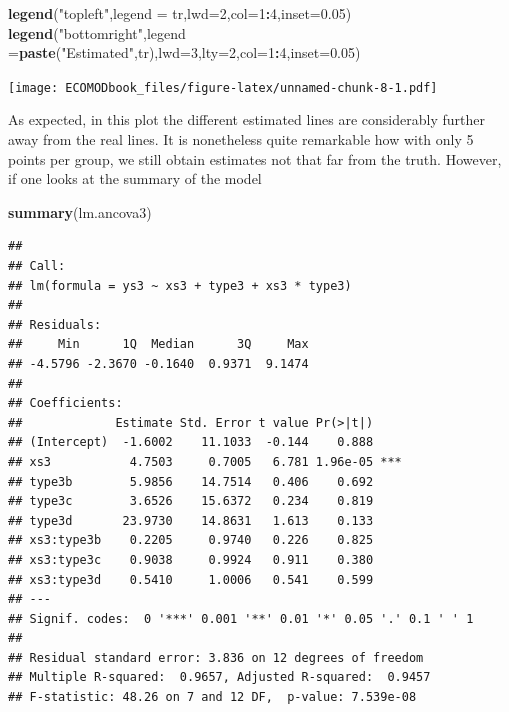 \documentclass[
]{book}
\newenvironment{Shaded}{\begin{snugshade}}{\end{snugshade}}
\newcommand{\AttributeTok}[1]{\textcolor[rgb]{0.13,0.29,0.53}{#1}}
\newcommand{\DecValTok}[1]{\textcolor[rgb]{0.00,0.00,0.81}{#1}}
\newcommand{\FloatTok}[1]{\textcolor[rgb]{0.00,0.00,0.81}{#1}}
\newcommand{\FunctionTok}[1]{\textcolor[rgb]{0.13,0.29,0.53}{\textbf{#1}}}
\newcommand{\NormalTok}[1]{#1}
\newcommand{\SpecialCharTok}[1]{\textcolor[rgb]{0.81,0.36,0.00}{\textbf{#1}}}
\newcommand{\StringTok}[1]{\textcolor[rgb]{0.31,0.60,0.02}{#1}}
\begin{document}
\begin{Shaded}
\begin{Highlighting}[]
\FunctionTok{legend}\NormalTok{(}\StringTok{"topleft"}\NormalTok{,}\AttributeTok{legend =}\NormalTok{ tr,}\AttributeTok{lwd=}\DecValTok{2}\NormalTok{,}\AttributeTok{col=}\DecValTok{1}\SpecialCharTok{:}\DecValTok{4}\NormalTok{,}\AttributeTok{inset=}\FloatTok{0.05}\NormalTok{)}
\FunctionTok{legend}\NormalTok{(}\StringTok{"bottomright"}\NormalTok{,}\AttributeTok{legend =}\FunctionTok{paste}\NormalTok{(}\StringTok{"Estimated"}\NormalTok{,tr),}\AttributeTok{lwd=}\DecValTok{3}\NormalTok{,}\AttributeTok{lty=}\DecValTok{2}\NormalTok{,}\AttributeTok{col=}\DecValTok{1}\SpecialCharTok{:}\DecValTok{4}\NormalTok{,}\AttributeTok{inset=}\FloatTok{0.05}\NormalTok{)}
\end{Highlighting}
\end{Shaded}

\texttt{[image: ECOMODbook\_files/figure-latex/unnamed-chunk-8-1.pdf]}

As expected, in this plot the different estimated lines are considerably further away from the real lines. It is nonetheless quite remarkable how with only 5 points per group, we still obtain estimates not that far from the truth. However, if one looks at the summary of the model

\begin{Shaded}
\begin{Highlighting}[]
\FunctionTok{summary}\NormalTok{(lm.ancova3)}
\end{Highlighting}
\end{Shaded}

\begin{verbatim}
## 
## Call:
## lm(formula = ys3 ~ xs3 + type3 + xs3 * type3)
## 
## Residuals:
##     Min      1Q  Median      3Q     Max 
## -4.5796 -2.3670 -0.1640  0.9371  9.1474 
## 
## Coefficients:
##             Estimate Std. Error t value Pr(>|t|)    
## (Intercept)  -1.6002    11.1033  -0.144    0.888    
## xs3           4.7503     0.7005   6.781 1.96e-05 ***
## type3b        5.9856    14.7514   0.406    0.692    
## type3c        3.6526    15.6372   0.234    0.819    
## type3d       23.9730    14.8631   1.613    0.133    
## xs3:type3b    0.2205     0.9740   0.226    0.825    
## xs3:type3c    0.9038     0.9924   0.911    0.380    
## xs3:type3d    0.5410     1.0006   0.541    0.599    
## ---
## Signif. codes:  0 '***' 0.001 '**' 0.01 '*' 0.05 '.' 0.1 ' ' 1
## 
## Residual standard error: 3.836 on 12 degrees of freedom
## Multiple R-squared:  0.9657, Adjusted R-squared:  0.9457 
## F-statistic: 48.26 on 7 and 12 DF,  p-value: 7.539e-08
\end{verbatim}
\end{document}
